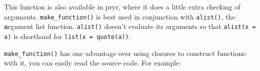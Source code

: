 This function is also available in pryr, where it does a little extra
checking of arguments. \texttt{make\_function()} is best used in
conjunction with \texttt{alist()}, the \textbf{a}rgument list function.
\texttt{alist()} doesn't evaluate its arguments so that
\texttt{alist(x = a)} is shorthand for \texttt{list(x = quote(a))}.

\begin{Shaded}
\begin{Highlighting}[]
\StringTok{ }\NormalTok{(}\NormalTok{(} \NormalTok{, } \NormalTok{), }\StringTok{ }
\NormalTok{(}\NormalTok{)}
\NormalTok{(}\NormalTok{, }\NormalTok{)}

\NormalTok{(}\NormalTok{(} \NormalTok{, } \StringTok{ }
\NormalTok{(}\NormalTok{(} \NormalTok{, } \NormalTok{, }\NormalTok{), }\StringTok{ }
\end{Highlighting}
\end{Shaded}

\texttt{make\_function()} has one advantage over using closures to
construct functions: with it, you can easily read the source code. For
example:

\begin{Shaded}
\begin{Highlighting}[]
\StringTok{ }
  \NormalTok{(}\NormalTok{(}\NormalTok{), }\StringTok{ }\NormalTok{())}
\NormalTok{\}}
\NormalTok{(}\NormalTok{)}
\CommentTok{#> \{}
\CommentTok{#> \}}
\end{Highlighting}
\end{Shaded}

